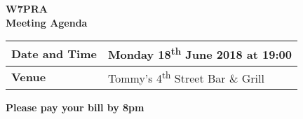\documentclass[letter,11pt]{extarticle}
\begin{document}
	\thispagestyle{empty}
	
	\begin{center}
		\textbf{W7PRA\\Meeting Agenda}
		\vspace{0.33cm}
	\end{center}
	
	\begin{center}
		\begin{tabular}{| m{3.0cm} | m{7.5cm} |} \hline
			\textbf{Date and Time} & Monday 18\textsuperscript{th} June 2018 at 19:00 \\ \hline
			\textbf{Venue} & Tommy's 4\textsuperscript{th} Street Bar \& Grill \\ \hline
				\end{tabular}
	\end{center}
	
	\begin{center}
		\textbf{Please pay your bill by 8pm}
	\end{center}
	
\end{document}
